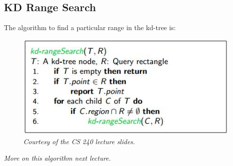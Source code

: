 \documentclass{report}
\begin{document}
\subsection{KD Range Search}
The algorithm to find a particular range in the kd-tree is:
\begin{figure}[ht]
\begin{center}
\includegraphics[scale=0.6]{range2.jpg}
\end{center}
\caption{\textit{Courtesy of the CS 240 lecture slides.}}
\end{figure}
\textit{More on this algorithm next lecture.}
\end{document}
